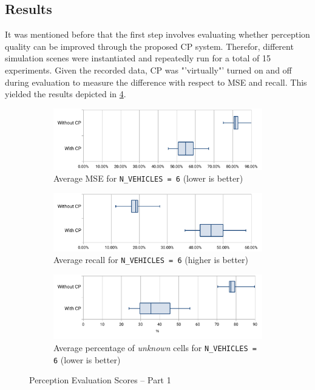 \subsection{Results}
\label{subsec:evaluation:perception_evaluation:results}
It was mentioned before that the first step involves evaluating whether perception quality can be improved through the proposed CP system. Therefor, different simulation scenes were instantiated and repeatedly run for a total of 15 experiments. Given the recorded data, CP was "'virtually"' turned on and off during evaluation to measure the difference with respect to MSE and recall. This yielded the results depicted in \cref{fig:perception_evalutation_scores_1}.

\begin{figure}
	\centering
	\begin{subfigure}[b]{0.9\textwidth}
		\includegraphics[width=1\linewidth]{98_images/eval_boxplot_2}
		\caption{Average MSE for \texttt{N\_VEHICLES = 6} (lower is better)}
		\label{fig:eval_boxplot_2} 
	\end{subfigure}
	
	\begin{subfigure}[b]{0.9\textwidth}
		\includegraphics[width=1\linewidth]{98_images/eval_boxplot_3}
		\caption{Average recall for \texttt{N\_VEHICLES = 6} (higher is better)}
		\label{fig:eval_boxplot_3}
	\end{subfigure}

	\begin{subfigure}[b]{0.9\textwidth}
		\includegraphics[width=1\linewidth]{98_images/eval_boxplot_1}
		\caption{Average percentage of \textit{unknown} cells for \texttt{N\_VEHICLES = 6} (lower is better)}
		\label{fig:eval_boxplot_1}
	\end{subfigure}
	\caption{Perception Evaluation Scores – Part 1}
	\label{fig:perception_evalutation_scores_1}
\end{figure}

